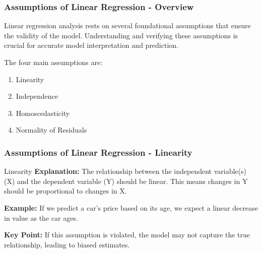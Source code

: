 \documentclass{beamer}
\begin{document}
\begin{frame}[fragile]
    \frametitle{Assumptions of Linear Regression - Overview}
    Linear regression analysis rests on several foundational assumptions that ensure the validity of the model. 
    Understanding and verifying these assumptions is crucial for accurate model interpretation and prediction.
    
    The four main assumptions are:
    \begin{enumerate}
        \item Linearity
        \item Independence
        \item Homoscedasticity
        \item Normality of Residuals
    \end{enumerate}
\end{frame}

\begin{frame}[fragile]
    \frametitle{Assumptions of Linear Regression - Linearity}
    \begin{block}{Linearity}
        \textbf{Explanation:} The relationship between the independent variable(s) (X) and the dependent variable (Y) should be linear.
        This means changes in Y should be proportional to changes in X.
    \end{block}
    
    \textbf{Example:} If we predict a car’s price based on its age, we expect a linear decrease in value as the car ages.
    
    \textbf{Key Point:} If this assumption is violated, the model may not capture the true relationship, leading to biased estimates.
\end{frame}
\end{document}
